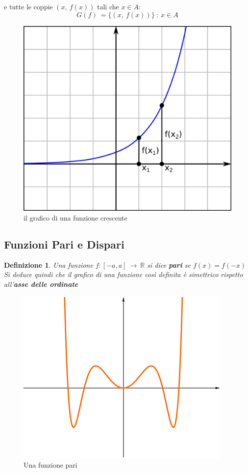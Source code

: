 \documentclass[12pt, a4paper]{article}
\theoremstyle{break}
\newtheorem{defn}{Definizione}
\theoremstyle{lemma}
\theoremstyle{lemma}
\theoremstyle{lemma}
\begin{document}
e tutte le coppie $(x,\ f(x))$ tali che $x\in A$:\\

\begin{equation}
G(f)\ = \{(x,\ f(x))\} \ :\ x\in A
\end{equation}

\begin{figure}[ht]
  \center
  \includegraphics[scale=0.15]{graficofunzione}
  \caption {il grafico di una funzione crescente}
  \label{fig:grafico_funzione}
\end{figure}

\subsection{Funzioni Pari e Dispari}
\begin{defn}
Una funzione $f: [-a, a]\ \rightarrow \ \mathbb{R}$ si dice \textbf{pari} se $f(x) = f(-x)$\\
Si deduce quindi che il grafico di una funzione così definita è simettrico rispetto all'\textbf{asse delle ordinate}
\end{defn}

\begin{figure}
  \center
  \includegraphics[scale=0.65]{funzionepari}
  \caption{Una funzione pari}
  \label{fig:funzione_pari_grafico}
\end{figure}
\end{document}

